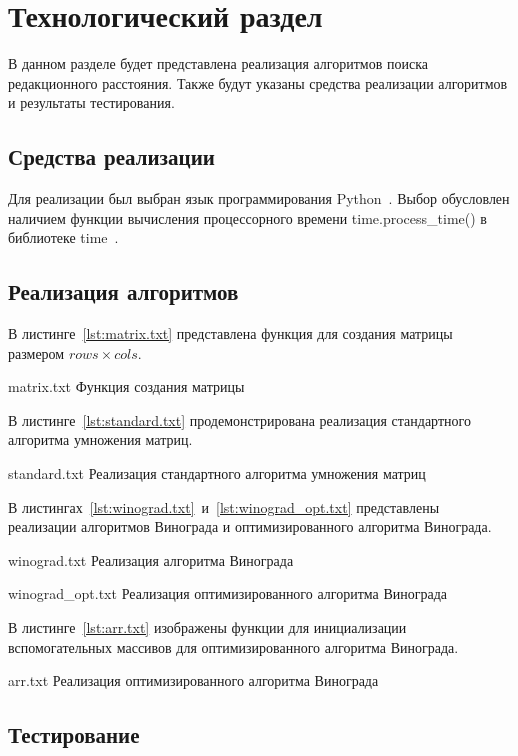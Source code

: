 \chapter{Технологический раздел}

В данном разделе будет представлена реализация алгоритмов поиска редакционного расстояния. Также будут указаны средства реализации алгоритмов и результаты тестирования.

\section{Средства реализации}

Для реализации был выбран язык программирования Python~\cite{python}. Выбор обусловлен наличием функции вычисления процессорного времени time.process\_time() в библиотеке time~\cite{time}.

\section{Реализация алгоритмов}

В листинге~\ref{lst:matrix.txt} представлена функция для создания матрицы размером $rows \times cols$.

{matrix.txt}
{Функция создания матрицы}

В листинге~\ref{lst:standard.txt} продемонстрирована реализация стандартного алгоритма умножения матриц.

\clearpage

{standard.txt}
{Реализация стандартного алгоритма умножения матриц}

\clearpage

В листингах~\ref{lst:winograd.txt}~и~\ref{lst:winograd_opt.txt}  представлены реализации алгоритмов Винограда и оптимизированного алгоритма Винограда.

{winograd.txt}
{Реализация алгоритма Винограда}

\clearpage

{winograd_opt.txt}
{Реализация оптимизированного алгоритма Винограда}

\clearpage

В листинге~\ref{lst:arr.txt} изображены функции для инициализации вспомогательных массивов для оптимизированного алгоритма Винограда.

{arr.txt}
{Реализация оптимизированного алгоритма Винограда}

\section{Тестирование}

